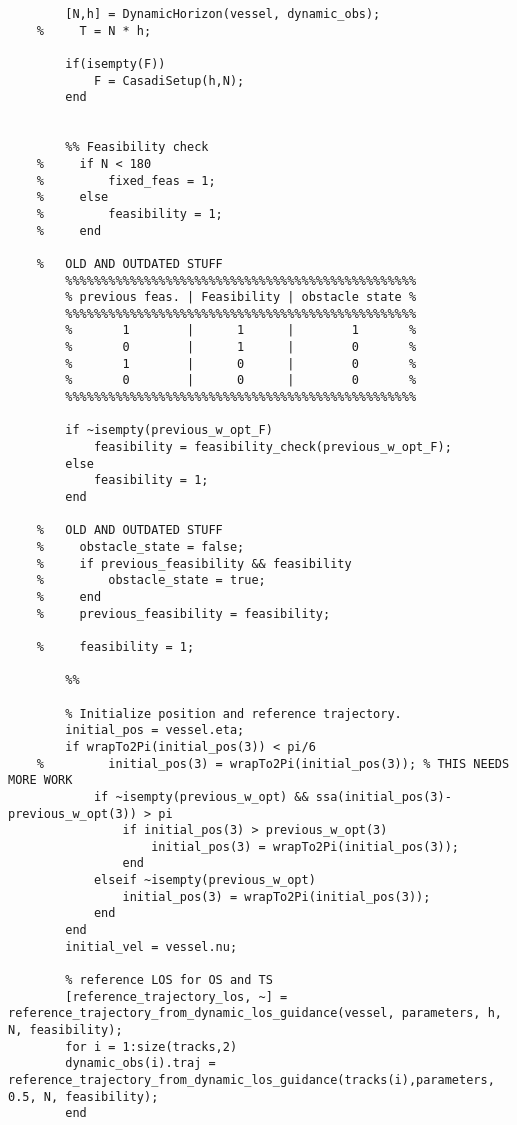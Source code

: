 \begin{lstlisting}
        [N,h] = DynamicHorizon(vessel, dynamic_obs);
    %     T = N * h;
    
        if(isempty(F))
            F = CasadiSetup(h,N);
        end
        
        
        %% Feasibility check
    %     if N < 180
    %         fixed_feas = 1;
    %     else
    %         feasibility = 1;
    %     end
        
    %   OLD AND OUTDATED STUFF
        %%%%%%%%%%%%%%%%%%%%%%%%%%%%%%%%%%%%%%%%%%%%%%%%%
        % previous feas. | Feasibility | obstacle state %
        %%%%%%%%%%%%%%%%%%%%%%%%%%%%%%%%%%%%%%%%%%%%%%%%%
        %       1        |      1      |        1       %
        %       0        |      1      |        0       %
        %       1        |      0      |        0       %
        %       0        |      0      |        0       %
        %%%%%%%%%%%%%%%%%%%%%%%%%%%%%%%%%%%%%%%%%%%%%%%%%
        
        if ~isempty(previous_w_opt_F)
            feasibility = feasibility_check(previous_w_opt_F);
        else
            feasibility = 1;
        end
    
    %   OLD AND OUTDATED STUFF    
    %     obstacle_state = false;    
    %     if previous_feasibility && feasibility
    %         obstacle_state = true;
    %     end
    %     previous_feasibility = feasibility;
    
    %     feasibility = 1;
    
        %%
        
        % Initialize position and reference trajectory.
        initial_pos = vessel.eta;
        if wrapTo2Pi(initial_pos(3)) < pi/6
    %         initial_pos(3) = wrapTo2Pi(initial_pos(3)); % THIS NEEDS MORE WORK
            if ~isempty(previous_w_opt) && ssa(initial_pos(3)-previous_w_opt(3)) > pi
                if initial_pos(3) > previous_w_opt(3)
                    initial_pos(3) = wrapTo2Pi(initial_pos(3));
                end
            elseif ~isempty(previous_w_opt)
                initial_pos(3) = wrapTo2Pi(initial_pos(3));
            end
        end
        initial_vel = vessel.nu;
    
        % reference LOS for OS and TS
        [reference_trajectory_los, ~] = reference_trajectory_from_dynamic_los_guidance(vessel, parameters, h, N, feasibility);
        for i = 1:size(tracks,2)
        dynamic_obs(i).traj = reference_trajectory_from_dynamic_los_guidance(tracks(i),parameters, 0.5, N, feasibility);
        end
        

\end{lstlisting}
